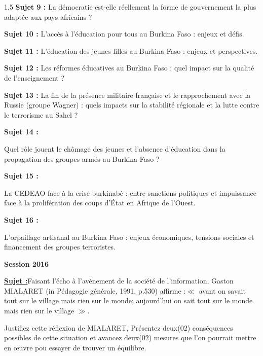 \documentclass[12pt]{article}
\begin{document}
\begin{spacing}{1.5}
\textbf{Sujet 9 :} La démocratie est-elle réellement la forme de gouvernement la plus adaptée aux pays africains ?

\quad
\quad

\textbf{Sujet 10 :} L'accès à l'éducation pour tous au Burkina Faso : enjeux et défis.


\quad
\quad

\textbf{Sujet 11 :} L'éducation des jeunes filles au Burkina Faso : enjeux et perspectives.


\quad
\quad

\textbf{Sujet 12 :} Les réformes éducatives au Burkina Faso : quel impact sur la qualité de l'enseignement ?


\quad
\quad

\textbf{Sujet 13 :}
La fin de la présence militaire française et le rapprochement avec la Russie (groupe Wagner) : quels impacts sur la stabilité régionale et la lutte contre le terrorisme au Sahel ?

\quad
\quad

\textbf{Sujet 14 :}

Quel rôle jouent le chômage des jeunes et l'absence d'éducation dans la propagation des groupes armés au Burkina Faso ?

\quad
\quad

\textbf{Sujet 15 :}

La CEDEAO face à la crise burkinabè : entre sanctions politiques et impuissance face à la prolifération des coups d'État en Afrique de l'Ouest.




\quad
\quad

\textbf{Sujet 16 :}

L'orpaillage artisanal au Burkina Faso : enjeux économiques, tensions sociales et financement des groupes terroristes.


\quad



\textbf{Session 2016}

\textbf{\underline{Sujet :}}Faisant l'écho à l'avènement de la société de l'information, Gaston MIALARET (in Pédagogie générale, 1991, p.530) affirme :$\ll$ avant on savait tout sur le village mais rien sur le monde; aujourd'hui on sait tout sur le monde mais rien sur le village $\gg$.

Justifiez cette réflexion de MIALARET, Présentez deux(02) conséquences possibles de cette situation et avancez deux(02) mesures que l'on pourrait mettre en œuvre pou essayer de trouver un équilibre.



\end{spacing}
\end{document}
